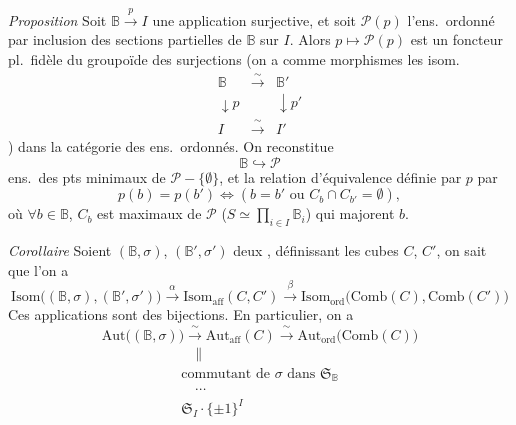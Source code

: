 \documentclass[11pt,a4paper]{article}
\begin{document}
\emph{Proposition} Soit $\mathbb{B} \xrightarrow{p} I$ une application
surjective, et soit $\mathcal{P}(p)$ l'ens.\ ordonné par inclusion des
sections partielles de $\mathbb{B}$ sur $I$. Alors $p \mapsto
\mathcal{P}(p)$ est un foncteur pl.\ fidèle du groupoïde des surjections
\struck{\ill{}} (on a comme morphismes les isom.
\[
  \begin{array}{ccc}
    \mathbb{B} & \xrightarrow{\ \sim\ } & \mathbb{B}' \\
    \downarrow p & & \downarrow p' \\
    I & \xrightarrow{\ \sim\ } & I'
  \end{array}
\]
) dans la catégorie des ens.\ ordonnés. On reconstitue
\[
  \mathbb{B} \hookrightarrow \mathcal{P}
\]
ens.\ des pts \struck{\ill{}} minimaux de $\mathcal{P} - \lbrace \emptyset
\rbrace$, et la relation d'équivalence définie par $p$ par
\[
  p(b) = p(b') \Longleftrightarrow (b = b' \text{ ou } C_b \cap C_{b'} =
  \emptyset),
\]
où $\forall b \in \mathbb{B}$, $C_b$ est 
 maximaux de $\mathcal{P}$ ($S \simeq
\prod_{i \in I} \mathbb{B}_i$) \struck{\ill{}} qui majorent $b$.


\emph{Corollaire} Soient $(\mathbb{B}, \sigma)$, $(\mathbb{B}', \sigma')$
deux \struck{\ill{}} \add{\ill{}} \ill{},  définissant les
cubes $C$, $C'$, on sait que l'on a
\[
  \mathrm{Isom}\bigl((\mathbb{B}, \sigma), (\mathbb{B}', \sigma')\bigr)
  \xrightarrow{\ \alpha\ } \mathrm{Isom}_{\mathrm{aff}}(C, C')
  \xrightarrow{\ \beta\ } \mathrm{Isom}_{\mathrm{ord}}\bigl(\mathrm{Comb}(C),
  \mathrm{Comb}(C')\bigr)
\]
Ces applications sont des bijections. En particulier, on a
\[
  \mathrm{Aut}\bigl((\mathbb{B}, \sigma)\bigr) \xrightarrow{\ \sim\ }
  \mathrm{Aut}_{\mathrm{aff}}(C) \xrightarrow{\ \sim\ }
  \mathrm{Aut}_{\mathrm{ord}}\bigl(\mathrm{Comb}(C)\bigr)
\]
\[
  \begin{array}{l}
    \quad \| \\
    \text{commutant de } \sigma \text{ dans } \mathfrak{S}_{\mathbb{B}} \\
    \quad \cdots \\
    \mathfrak{S}_I \cdot \lbrace \pm 1 \rbrace^I
  \end{array}
\]
\end{document}

